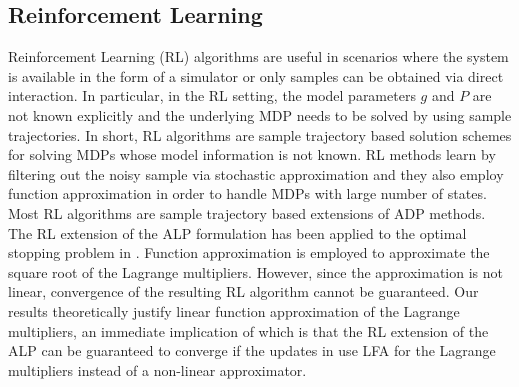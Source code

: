 \subsection{Reinforcement Learning}
Reinforcement Learning (RL) algorithms are useful in scenarios where the system is available in the form of a simulator or only samples can be obtained via direct interaction. In particular, in the RL setting, the model parameters $g$ and $P$ are not known explicitly and the underlying MDP needs to be solved by using sample trajectories. In short, RL algorithms are sample trajectory based solution schemes for solving MDPs whose model information is not known. RL methods learn by filtering out the noisy sample via stochastic approximation and they also employ function approximation in order to handle MDPs with large number of states. Most RL algorithms are sample trajectory based extensions of ADP methods.\\
The RL extension of the ALP formulation has been applied to the optimal stopping problem in \cite{ALP-Bor}. Function approximation is employed to approximate the square root of the Lagrange multipliers. However, since the approximation is not linear, convergence of the resulting RL algorithm cannot be guaranteed. Our results theoretically justify linear function approximation of the Lagrange multipliers, an immediate implication of which is that the RL extension of the ALP can be guaranteed to converge if the updates in \cite{ALP-Bor} use LFA for the Lagrange multipliers instead of a non-linear approximator.
